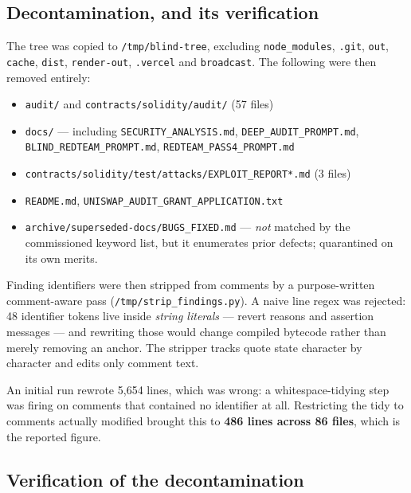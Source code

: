 \documentclass[11pt,a4paper]{article}
\newcommand{\code}[1]{\texttt{\small #1}}
\begin{document}
\subsection{Decontamination, and its verification}

The tree was copied to \code{/tmp/blind-tree}, excluding \code{node\_modules}, \code{.git},
\code{out}, \code{cache}, \code{dist}, \code{render-out}, \code{.vercel} and
\code{broadcast}. The following were then removed entirely:

\begin{itemize}
\item \code{audit/} and \code{contracts/solidity/audit/} (57 files)
\item \code{docs/} --- including \code{SECURITY\_ANALYSIS.md}, \code{DEEP\_AUDIT\_PROMPT.md},
      \code{BLIND\_REDTEAM\_PROMPT.md}, \code{REDTEAM\_PASS4\_PROMPT.md}
\item \code{contracts/solidity/test/attacks/EXPLOIT\_REPORT*.md} (3 files)
\item \code{README.md}, \code{UNISWAP\_AUDIT\_GRANT\_APPLICATION.txt}
\item \code{archive/superseded-docs/BUGS\_FIXED.md} --- \emph{not} matched by the
      commissioned keyword list, but it enumerates prior defects; quarantined on its own
      merits.
\end{itemize}

Finding identifiers were then stripped from comments by a purpose-written
comment-aware pass (\code{/tmp/strip\_findings.py}). A naive line regex was rejected: 48
identifier tokens live inside \emph{string literals} --- revert reasons and assertion
messages --- and rewriting those would change compiled bytecode rather than merely
removing an anchor. The stripper tracks quote state character by character and edits only
comment text.

An initial run rewrote 5{,}654 lines, which was wrong: a whitespace-tidying step was
firing on comments that contained no identifier at all. Restricting the tidy to comments
actually modified brought this to \textbf{486 lines across 86 files}, which is the
reported figure.

\subsection{Verification of the decontamination}
\end{document}
